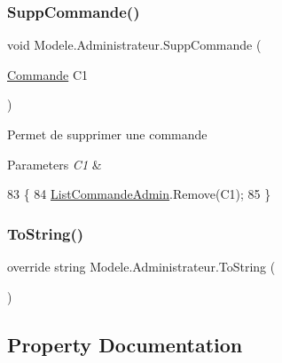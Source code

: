 \subsubsection{\texorpdfstring{Supp\+Commande()}{SuppCommande()}}
{\footnotesize\ttfamily void Modele.\+Administrateur.\+Supp\+Commande (\begin{DoxyParamCaption}\item[{\hyperlink{classModele_1_1Commande}{Commande}}]{C1 }\end{DoxyParamCaption})\hspace{0.3cm}{\ttfamily [inline]}}



Permet de supprimer une commande 


\begin{DoxyParams}{Parameters}
{\em C1} & \\
\hline
\end{DoxyParams}

\begin{DoxyCode}
83         \{
84             \hyperlink{classModele_1_1Administrateur_ad73b7b5b20cd940be7176a42cffda851}{ListCommandeAdmin}.Remove(C1);
85         \}
\end{DoxyCode}
\mbox{\label{classModele_1_1Administrateur_a71e57f381897a6adf83b43cdd1e47cde}} 
\subsubsection{\texorpdfstring{To\+String()}{ToString()}}
{\footnotesize\ttfamily override string Modele.\+Administrateur.\+To\+String (\begin{DoxyParamCaption}{ }\end{DoxyParamCaption})\hspace{0.3cm}{\ttfamily [inline]}}




\subsection{Property Documentation}
\mbox{\label{classModele_1_1Administrateur_ad73b7b5b20cd940be7176a42cffda851}} 
